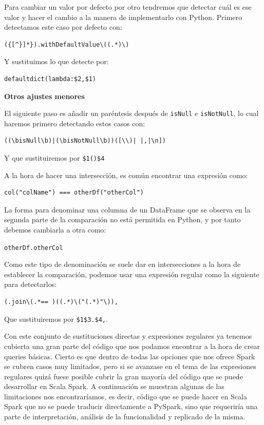 \documentclass[12pt,twoside,titlepage]{report}
\begin{document}
Para cambiar un valor por defecto por otro tendremos que detectar cuál es ese valor y hacer el cambio a la manera de implementarlo con Python. Primero detectamos este caso por defecto con:

\begin{lstlisting}
({[^}]*}).withDefaultValue\((.*)\)
\end{lstlisting}

Y sustituimos lo que detecte por:

\begin{lstlisting}
defaultdict(lambda:$2,$1)
\end{lstlisting}


\textbf{Otros ajustes menores}

El siguiente paso es añadir un paréntesis después de \texttt{isNull} e \texttt{isNotNull}, lo cual haremos primero detectando estos casos con:

\begin{lstlisting}
((\bisNull\b)|(\bisNotNull\b))([\\)| |,|\n])
\end{lstlisting}

Y que sustituiremos por \texttt{\$1()\$4}

A la hora de hacer una intersección, es común encontrar una expresión como:

\begin{lstlisting}
col("colName") === otherDf("otherCol")
\end{lstlisting}

La forma para denominar una columna de un DataFrame que se observa en la segunda parte de la comparación no está permitida en Python, y por tanto debemos cambiarla a otra como:

\texttt{otherDf.otherCol}

Como este tipo de denominación se suele dar en intersecciones a la hora de establecer la comparación, podemos usar una expresión regular como la siguiente para detectarlos:

\begin{lstlisting}
(.join\(.*== )((.*)\("(.*)"\)),
\end{lstlisting}

Que sustituiremos por \texttt{\$1\$3.\$4,}.

Con este conjunto de sustituciones directas y expresiones regulares ya tenemos cubierta una gran parte del código que nos podamos encontrar a la hora de crear queries básicas. Cierto es que dentro de todas las opciones que nos ofrece Spark se cubren casos muy limitados, pero si se avanzase en el tema de las expresiones regulares quizá fuese posible cubrir la gran mayoría del código que se puede desarrollar en Scala Spark. A continuación se muestran algunas de las limitaciones nos encontraríamos, es decir, código que se puede hacer en Scala Spark que no se puede traducir directamente a PySpark, sino que requeriría una parte de interpretación, análisis de la funcionalidad y replicado de la misma.
\end{document}
